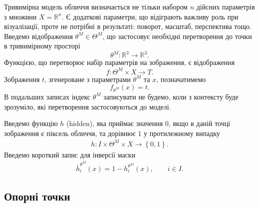 Тривимірна модель обличчя визначається не тільки набором $n$ дійсних параметрів
з множини $X = \mathbb{R}^n$.
Є додаткові параметри, що відіграють важливу роль при візуалізації,
проте не потрібні в результаті: поворот, масштаб, перспектива тощо.
Введемо відображення $\theta^M \in \Theta^M$,
що застосовує необхідні перетворення до точки в тривимірному просторі
\begin{equation*}
  \theta^M: \mathbb{R}^3 \rightarrow \mathbb{R}^3.
\end{equation*}
Функцією, що перетворює набір параметрів на зображення, є відображення
\begin{equation*}
  f: \Theta^M \times X \rightarrow T.
\end{equation*}
Зображення $t$, згенероване з параметрами $\theta^M$ та $x$, позначатимемо
\begin{equation*}
  f_{\theta^M} \left( x \right) = t.
\end{equation*}
В подальших записах індекс $\theta^M$ записувати не будемо,
коли з контексту буде зрозуміло, які перетворення застосовуються до моделі.

Введемо функцію $h$ (hidden), яка приймає значення $0$,
якщо в даній точці зображення є піксель обличчя,
та дорівнює $1$ у протилежному випадку
\begin{align*}
  h: I \times \Theta^M \times X \rightarrow \left\{ 0, 1 \right\}.
\end{align*}
Введемо короткий запис для інверсії маски
\begin{align*}
  \overline{h}^{\theta^M}_i\left( x \right)
  = 1 - h^{\theta^M}_i\left( x \right),\qquad
  i \in I.
\end{align*}

\subsection{Опорні точки}

